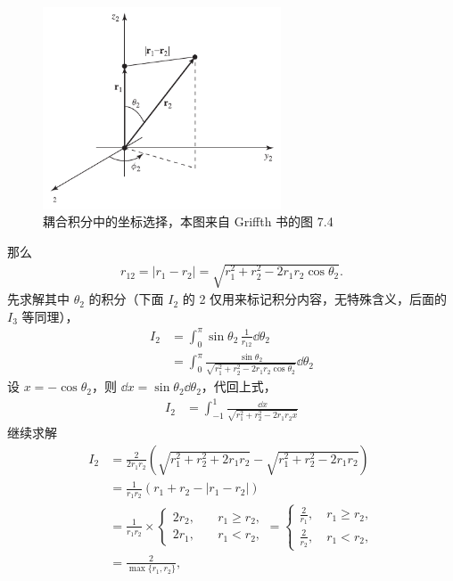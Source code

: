 \begin{figure}\centering
    \includegraphics[height=6cm]{fig/r2_integral.pdf}
    \caption{耦合积分中的坐标选择，本图来自 Griffth 书的图 7.4}
    \label{fig:coupled_r2}
\end{figure}
那么
\begin{align}
    r_12 = |r_1 - r_2| = \sqrt{r_1^2 + r_2^2 - 2r_1 r_2 \cos\theta_2}. 
\end{align}
先求解其中 $\theta_2$ 的积分（下面 $I_2$ 的 2 仅用来标记积分内容，无特殊含义，后面的 $I_3$ 等同理），
\begin{align}
    I_2&=\int_0^\pi \sin\theta_2 \, \frac1{r_{12}} \dd\theta_2 \\
    &=\int_0^\pi \frac{\sin\theta_2}{\sqrt{r_1^2 + r_2^2 - 2r_1 r_2 \cos\theta_2}}\dd\theta_2
\end{align}
设 $x = -\cos\theta_2$，则 $\dd x = \sin\theta_2\dd\theta_2$，代回上式，
\begin{align}
    I_2 &= \int_{-1}^1 \frac{\dd x}{\sqrt{r_1^2 + r_2^2 - 2r_1 r_2 x }}
\end{align}
继续求解
\begin{align}
    I_2&= \frac{2}{2r_1r_2} \left(
        \sqrt{r_1^2 + r_2^2 + 2r_1r_2} - \sqrt{r_1^2+r_2^2 - 2r_1r_2}
    \right) \\
    &= \frac1{r_1r_2} \left(
        r_1 + r_2 - |r_1 - r_2|
    \right)\\
    &= \frac1{r_1r_2} \times \begin{cases}
        2r_2, \quad & r_1 \geqslant r_2, \\
        2r_1, \quad & r_1 < r_2,
    \end{cases} 
    = \begin{cases}
        \frac{2}{r_1}, \quad r_1 \geqslant r_2, \\
        \frac{2}{r_2}, \quad r_1 < r_2, 
    \end{cases}
    \\
    &= \frac2{\max\{r_1, r_2\}},
\end{align}
